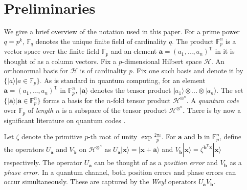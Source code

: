 \documentclass[conference]{IEEEtran}
\renewcommand{\=}{\approx}
\newcommand{\Va}{\mathbf{a}}
\newcommand{\Vb}{\mathbf{b}}
\newcommand{\ket}[1]{|#1\rangle}
\begin{document}



\section{Preliminaries}\label{sec:prelims}

We give a brief overview of the notation used in this paper. For a
prime power $q = p^k$, $\mathbb{F}_q$ denotes the unique finite field
of cardinality $q$. The product $\mathbb{F}_p^n$ is a vector space
over the finite field $\mathbb{F}_p$ and an element
$\mathbf{a}=(a_1,\ldots,a_n)^\mathrm{T}$ in it is thought of as a column
vectors.  Fix a $p$-dimensional Hilbert space $\mathcal{H}$. An
orthonormal basis for $\mathcal{H}$ is of cardinality $p$. Fix one
such basis and denote it by $\{ \ket{a} | a \in \mathbb{F}_p \}$.  As
is standard in quantum computing, for an element
$\mathbf{a}=(a_1,\ldots,a_n)^\mathrm{T}$ in $\mathbb{F}_p^n$,
$\ket{\mathbf{a}}$ denotes the tensor product
$\ket{a_1}\otimes\ldots\otimes\ket{a_n}$.  The set $\{
\ket{\mathbf{a}} | \mathbf{a} \in \mathbb{F}_p^n \}$ forms a basis for
the $n$-fold tensor product $\mathcal{H}^{\otimes^n}$. A
\emph{quantum code} over $\mathbb{F}_p$ of \emph{length} $n$ is a
subspace of the tensor product $\mathcal{H}^{\otimes^n}$. There is by
now a significant literature on quantum codes
\cite{knill2000theory,gottesman:1996:error,calderbank98quantum}.

Let $\zeta$ denote the primitive $p$-th root of unity
$\exp{\frac{2\pi\iota}{p}}$.  For $\Va$ and $\Vb$ in $\mathbb{F}_p^n$,
define the operators $U_{\mathbf{a}}$ and $V_{\mathbf{b}}$ on
$\mathcal{H}^{\otimes^n}$ as $U_\mathbf{a} \ket{\mathbf{x}} =
\ket{\mathbf{x} + \mathbf{a}}$ and $V_\mathbf{b} \ket{\mathbf{x}} =
\zeta^{\mathbf{b}^\mathrm{T} \mathbf{x}} \ket{\mathbf{x}}$
respectively. The operator $U_\mathbf{a}$ can be thought of as a
\emph{position error} and $V_\mathbf{b}$ as a \emph{phase error}. In a
quantum channel, both position errors and phase errors can occur
simultaneously. These are captured by the \emph{Weyl} operators
$U_\mathbf{a} V_\mathbf{b}$.
\end{document}

